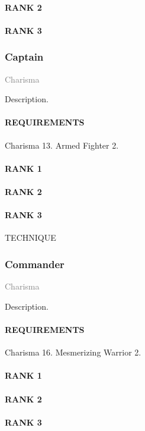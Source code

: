 \paragraph{RANK 2}
\paragraph{RANK 3}

\subsubsection{Captain} \label{feat::captain}
\small{\textcolor{gray}{Charisma}}

\normalsize
Description.
\paragraph{REQUIREMENTS} Charisma 13. Armed Fighter 2.
\paragraph{RANK 1}
\paragraph{RANK 2}
\paragraph{RANK 3} TECHNIQUE

\subsubsection{Commander} \label{feat::commander}
\small{\textcolor{gray}{Charisma}}

\normalsize
Description.
\paragraph{REQUIREMENTS} Charisma 16. Mesmerizing Warrior 2.
\paragraph{RANK 1}
\paragraph{RANK 2}
\paragraph{RANK 3} %

